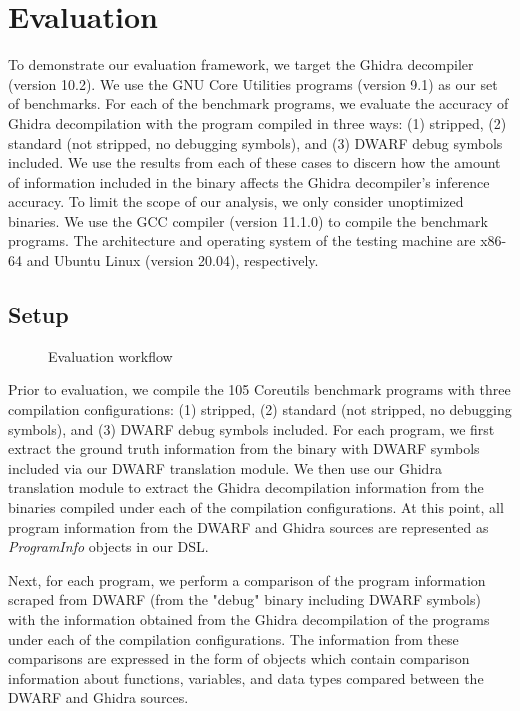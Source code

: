 \chapter{Evaluation} \label{sec:evaluation}

To demonstrate our evaluation framework, we target the Ghidra decompiler (version 10.2). We use the GNU Core Utilities programs (version 9.1) as our set of benchmarks. For each of the benchmark programs, we evaluate the accuracy of Ghidra decompilation with the program compiled in three ways: (1) stripped, (2) standard (not stripped, no debugging symbols), and (3) DWARF debug symbols included. We use the results from each of these cases to discern how the amount of information included in the binary affects the Ghidra decompiler's inference accuracy. To limit the scope of our analysis, we only consider unoptimized binaries. We use the GCC compiler (version 11.1.0) to compile the benchmark programs. The architecture and operating system of the testing machine are x86-64 and Ubuntu Linux (version 20.04), respectively.

\section{Setup}

\begin{figure}[ht]
    \centering
    \scalebox{0.5}{
        
    }
    \caption{Evaluation workflow}
    \label{fig:evaluation-process}
\end{figure}

Prior to evaluation, we compile the 105 Coreutils benchmark programs with three compilation configurations: (1) stripped, (2) standard (not stripped, no debugging symbols), and (3) DWARF debug symbols included. For each program, we first extract the ground truth information from the binary with DWARF symbols included via our DWARF translation module. We then use our Ghidra translation module to extract the Ghidra decompilation information from the binaries compiled under each of the compilation configurations. At this point, all program information from the DWARF and Ghidra sources are represented as \emph{ProgramInfo} objects in our DSL.

Next, for each program, we perform a comparison of the program information scraped from DWARF (from the "debug" binary including DWARF symbols) with the information obtained from the Ghidra decompilation of the programs under each of the compilation configurations. The information from these comparisons are expressed in the form of objects which contain comparison information about functions, variables, and data types compared between the DWARF and Ghidra sources.

